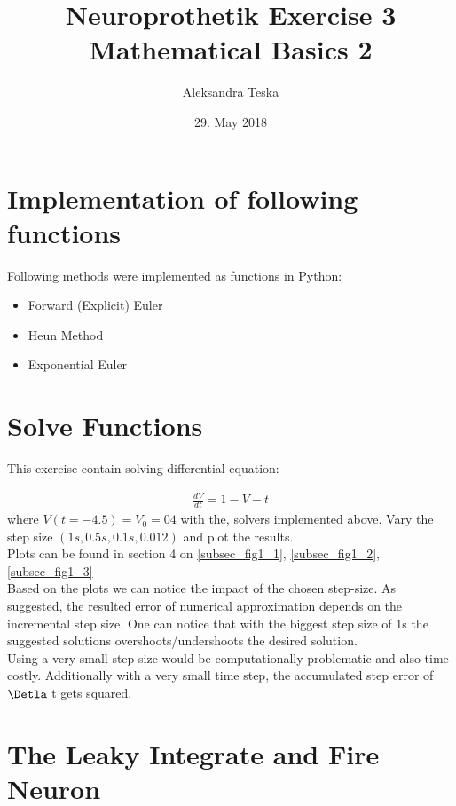 \documentclass{scrartcl}			%
\title{Neuroprothetik Exercise 3 \\
	Mathematical Basics 2}
\author{Aleksandra Teska}
\date{29. May 2018}
\begin{document}

\maketitle

\section{Implementation of following functions}		%
Following methods were implemented as functions in Python:
\begin{itemize}
	\item Forward (Explicit) Euler
	\item Heun Method
	\item Exponential Euler
\end{itemize}

\section{Solve Functions}		%

This exercise contain solving differential equation:

\begin{align}
\frac{dV}{dt} =  1 - V - t
\end{align}			
where $V(t = -4.5) = V_{0} = 04$ with the, solvers implemented above. Vary the step size $(1s, 0.5s, 0.1s, 0.012)$ and plot the results.\\
Plots can be found in section 4 on \ref{subsec_fig1_1}, \ref{subsec_fig1_2}, \ref{subsec_fig1_3}\\

Based on the plots we can notice the impact of the chosen step-size. As suggested, the resulted error of numerical approximation depends on the incremental step size. One can notice that with the biggest step size of 1s the suggested solutions overshoots/undershoots the desired solution.\\

Using a very small step size would be computationally problematic and also time costly. Additionally with a very small time step, the accumulated step error of $ \Detla $ t gets squared.

\newpage

\section{The Leaky Integrate and Fire Neuron}
\end{document}
